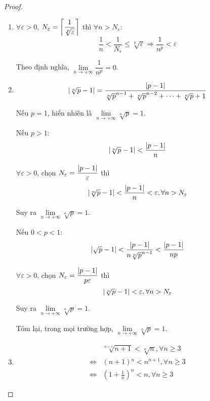 \documentclass[class=analysis,crop=false]{standalone}
\begin{document}
\begin{proof}
    \begin{enumerate}[label = (\roman*)]
        \item $\forall\varepsilon > 0$, $N_{\varepsilon} = \left\lceil{\dfrac{1}{\sqrt[p]{\varepsilon}}}\right\rceil$ thì $\forall n > N_{\varepsilon}$:
            \[
                \frac{1}{n} < \frac{1}{N_{\varepsilon}} \le \sqrt[p]{\varepsilon} \Longrightarrow \frac{1}{n^{p}} < \varepsilon
            \]
            \par Theo định nghĩa, $\lim\limits_{n\to+\infty} \dfrac{1}{n^{p}} = 0$.
        \item
            \[
                \left\vert{\sqrt[n]{p} - 1}\right\vert = \frac{\left\vert{p-1}\right\vert}{\sqrt[n]{p}^{n-1} + \sqrt[n]{p}^{n-2} + \cdots + \sqrt[n]{p} + 1}
            \]
            \par Nếu $p = 1$, hiển nhiên là $\lim\limits_{n\to+\infty} \sqrt[n]{p} = 1$.
            \par Nếu $p > 1$:
            \[
                \left\vert{\sqrt[n]{p} - 1}\right\vert < \frac{\left\vert{p-1}\right\vert}{n}
            \]
            \par$\forall\varepsilon > 0$, chọn $N_{\varepsilon} = \dfrac{\left\vert{p-1}\right\vert}{\varepsilon}$ thì
            \[
                \left\vert{\sqrt[n]{p} - 1}\right\vert < \frac{\left\vert{p-1}\right\vert}{n} < \varepsilon, \forall n > N_{\varepsilon}
            \]
            \par Suy ra $\lim\limits_{n\to+\infty} \sqrt[n]{p} = 1$.
            \par Nếu $0 < p < 1$:
            \[
                \left\vert{\sqrt{p} - 1}\right\vert < \frac{\left\vert{p-1}\right\vert}{n\sqrt[n]{p}^{n-1}} < \frac{\left\vert{p-1}\right\vert}{np}
            \]
            \par$\forall\varepsilon > 0$, chọn $N_{\varepsilon} = \dfrac{\left\vert{p-1}\right\vert}{p\varepsilon}$ thì
            \[
                \left\vert{\sqrt[n]{p} - 1}\right\vert < \varepsilon, \forall n > N_{\varepsilon}
            \]
            \par Suy ra $\lim\limits_{n\to+\infty} \sqrt[n]{p} = 1$.
            \par Tóm lại, trong mọi trường hợp, $\lim\limits_{n\to+\infty} \sqrt[n]{p} = 1$.
        \item
            \begin{align*}
                &\sqrt[n+1]{n+1} < \sqrt[n]{n}, \forall n\ge 3 \\
                \Leftrightarrow&(n+1){}^{n} < n^{n+1}, \forall n\ge 3 \\
                \Leftrightarrow&\left(1 + \frac{1}{n}\right)^{n} < n, \forall n\ge 3
            \end{align*}

\end{enumerate}
\end{proof}
\end{document}
